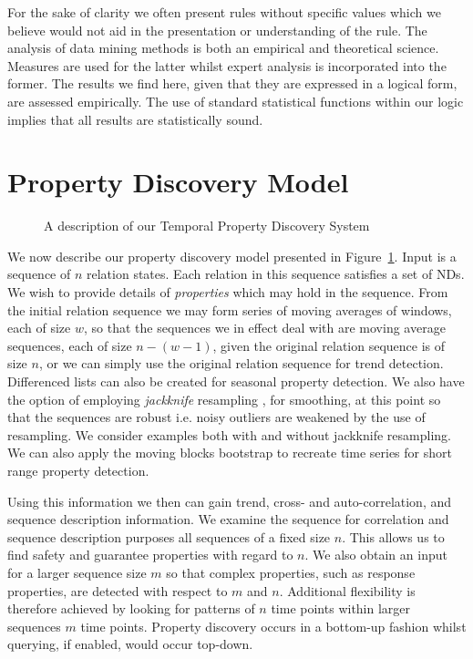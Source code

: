 \medskip

For the sake of clarity we often present rules without specific values
which we believe would not aid in the presentation or understanding of
the rule. The analysis of data mining methods is both an empirical and
theoretical science. Measures are used for the latter whilst expert
analysis is incorporated into the former. The results we find here,
given that they are expressed in a logical form, are assessed
empirically. The use of standard statistical functions within our
logic implies that all results are statistically
sound. 

\section{Property Discovery Model}\label{sec:tr_propmodel}


\begin{figure}[ht]
\centerline{}
\caption{\label{fig:model2} A description of our Temporal Property
Discovery System}
\end{figure}


We now describe our property discovery model presented in
Figure~\ref{fig:model2}. Input is a sequence of $n$ relation states.
Each relation in this sequence
satisfies a set of NDs. We wish to provide details of {\em properties}
which may hold in the sequence. From the initial relation sequence we
may form series of moving averages of windows, each of size $w$, so that
the sequences we in effect deal with are
moving average sequences, each of
size $n - (w-1)$, given the original relation sequence is of size $n$,
or we can simply use the original relation sequence for
trend detection. Differenced lists can also be created for seasonal
property detection. 
We also have the option of employing {\em jackknife}
resampling \cite{efr82}, for smoothing, at this point so that the
sequences are robust i.e. noisy outliers are weakened by the use of
resampling.  We consider examples both with and without jackknife
resampling. We can also apply the moving blocks bootstrap to recreate
time series for short range property detection.  
\medskip


Using
this information we then can gain trend, cross- and auto-correlation,
and sequence description information. We examine the sequence for correlation
and sequence description purposes all sequences of a fixed size
$n$. This allows us to find safety and guarantee properties with
regard to $n$.  We also obtain an input for a larger sequence size 
$m$ so
that complex properties, such as response properties, are detected
with respect to $m$ and $n$. Additional flexibility
is therefore achieved by looking for patterns of $n$  time points
within larger sequences $m$ time points. Property discovery occurs in
a bottom-up fashion whilst querying, if enabled, would occur top-down.

